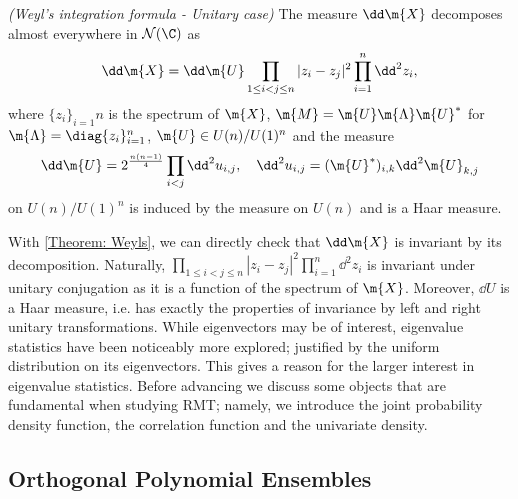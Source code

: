 \begin{teorema}	
	\label{Theorem: Weyls}
	\textit{(Weyl's integration formula - Unitary case)} 
	The measure $\dd \m{X}$ decomposes almost everywhere in $\mathcal{N}(\C)$ as 
	\begin{equation}
		\dd \m{X} = \dd \m{U} \prod_{1 \leq i < j \leq n} |z_i - z_j|^2  \prod_{i=1}^{n} \dd^2 z_i,
	\end{equation}
	where $\{z_i\}_{i=1}{n}$ is the spectrum of $\m{X}$, $\m{M} = \m{U} \m{\Lambda} \m{U}^*$ for $\m{\Lambda} =\diag\{z_i\}_{i=1}^n$, $\m{U} \in U(n)/U(1)^n$ and the measure
	\begin{equation}
		\dd \m{U} = 2^{\frac{n(n-1)}{4}} \prod_{i<j} \dd^2 u_{i,j}, \quad \dd^2 u_{i,j} = (\m{U}^*)_{i,k}\dd^2\m{U}_{k,j}
	\end{equation}
	on $U(n)/U(1)^n$ is induced by the measure on $U(n)$ and is a Haar measure.
\end{teorema}

With \autoref{Theorem: Weyls}, we can directly check that $\dd \m{X}$ is invariant by its decomposition. Naturally, $\prod_{1 \leq i < j \leq n} |z_i - z_j|^2  \prod_{i=1}^{n} \dd^2 z_i$ is invariant under unitary conjugation as it is a function of the spectrum of $\m{X}$. Moreover, $\dd{U}$ is a Haar measure, i.e. has exactly the properties of invariance by left and right unitary transformations. While eigenvectors may be of interest, eigenvalue statistics have been noticeably more explored; justified by the uniform distribution on its eigenvectors. This gives a reason for the larger interest in eigenvalue statistics. Before advancing we discuss some objects that are fundamental when studying RMT; namely, we introduce the joint probability density function, the correlation function and the univariate density. 

 \subsection{Orthogonal Polynomial Ensembles}
\label{Subsection: Orthogonal Ensembles}

